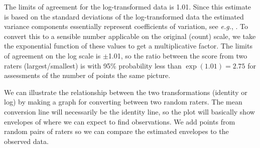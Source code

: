 \documentclass[aoas]{imsart}
\makeatletter
\newcommand{\code}[1]{\texttt{#1}\@\xspace}
\newcommand{\eg}{\emph{e.g.}\@\xspace}
\makeatother
\begin{document}
%
%
The limits of agreement for the log-transformed data is
1.01. Since this estimate
is based on the standard deviations of the log-transformed data the
estimated variance components essentially represent coefficients of
variation, see \eg, \citet[chapter 9]{Carstensen.2010b}. To convert this
to a sensible number applicable on the original (count) scale, we take
the exponential function of these values to get a multiplicative
factor.
%
The limits of agreement on the log scale is
$\pm$1.01, so the ratio
between the score from two raters (largest/smallest) is with 95\%
probability less than  $\exp(1.01) = 2.75$ for
assessments of the number of points the same picture.


We can illustrate the relationship between the two transformations
(identity or log) by making a graph for converting between two random
raters. The mean conversion line will necessarily be the identity
line, so the plot will basically show envelopes of where we can expect
to find observations. We add points from random pairs of raters so we can
compare the estimated envelopes to the observed data.
\end{document}
